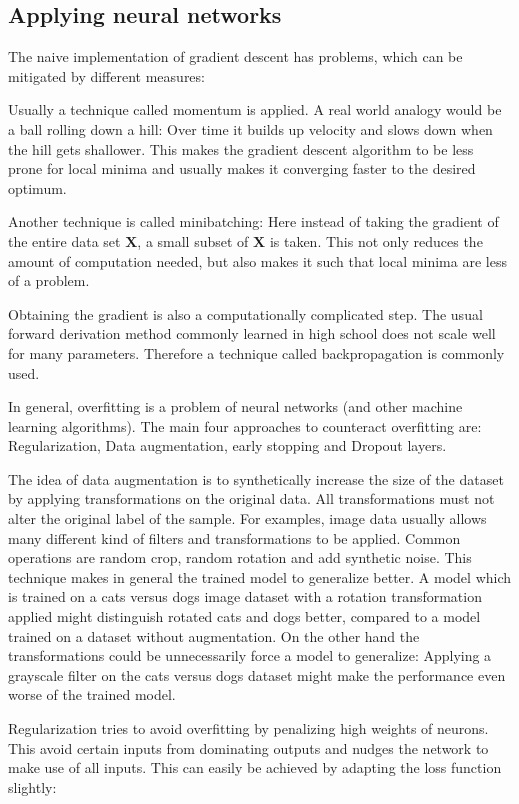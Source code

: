\documentclass[draft,final,oneside]{vutinfth} %
\begin{document}
\subsection{Applying neural networks}

The naive implementation of gradient descent has problems, which can be mitigated by different measures:

Usually a technique called momentum is applied. A real world analogy would be a ball rolling down a hill: Over time it builds up velocity and slows down when the hill gets shallower. This makes the gradient descent algorithm to be less prone for local minima and usually makes it converging faster to the desired optimum.

Another technique is called minibatching: Here instead of taking the gradient of the entire data set $\boldsymbol{X}$, a small subset of $\boldsymbol{X}$ is taken. This not only reduces the amount of computation needed, but also makes it such that local minima are less of a problem.

Obtaining the gradient is also a computationally complicated step. The usual forward derivation method commonly learned in high school does not scale well for many parameters. Therefore a technique called backpropagation is commonly used. \cite{colahbackprop}

In general, overfitting is a problem of neural networks (and other machine learning algorithms). The main four approaches to counteract overfitting are: Regularization, Data augmentation, early stopping and Dropout layers. 

The idea of data augmentation is to synthetically increase the size of the dataset by applying transformations on the original data. All transformations must not alter the original label of the sample. For examples, image data usually allows many different kind of filters and transformations to be applied. Common operations are random crop, random rotation and add synthetic noise. This technique makes in general the trained model to generalize better. A model which is trained on a cats versus dogs image dataset with a rotation transformation applied might distinguish rotated cats and dogs better, compared to a model trained on a dataset without augmentation. On the other hand the transformations could be unnecessarily force a model to generalize: Applying a grayscale filter on the cats versus dogs dataset might make the performance even worse of the trained model.

Regularization tries to avoid overfitting by penalizing	high weights of neurons. This avoid certain inputs from dominating outputs and nudges the network to make use of all inputs. This can easily be achieved by adapting the loss function slightly:
\end{document}
